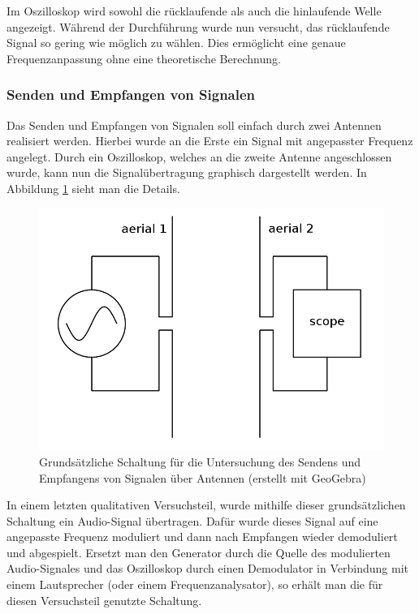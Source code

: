 		Im Oszilloskop wird sowohl die rücklaufende als auch die hinlaufende Welle angezeigt.
		Während der Durchführung wurde nun versucht, das rücklaufende Signal so gering wie möglich zu wählen.
		Dies ermöglicht eine genaue Frequenzanpassung ohne eine theoretische Berechnung.\cite{unterlagen}


	\subsubsection{Senden und Empfangen von Signalen} %
	\label{ssub:senden_und_empfangen_von_signalen}
	
		Das Senden und Empfangen von Signalen soll einfach durch zwei Antennen realisiert werden.
		Hierbei wurde an die Erste ein Signal mit angepasster Frequenz angelegt.
		Durch ein Oszilloskop, welches an die zweite Antenne angeschlossen wurde, kann nun die Signalübertragung graphisch dargestellt werden.
		In Abbildung \ref{schaltung_antennen_1} sieht man die Details.

		\begin{figure}[H]
		 	\center
		 	\includegraphics[scale = 0.4]{schaltung-antennen-01.png}
		 	\caption{\centering Grundsätzliche Schaltung für die Untersuchung des Sendens und Empfangens von Signalen über Antennen (erstellt mit GeoGebra)}
		 	\label{schaltung_antennen_1}
		\end{figure}

		In einem letzten qualitativen Versuchsteil, wurde mithilfe dieser grundsätzlichen Schaltung ein Audio-Signal übertragen.
		Dafür wurde dieses Signal auf eine angepasste Frequenz moduliert und dann nach Empfangen wieder demoduliert und abgespielt.
		Ersetzt man den Generator durch die Quelle des modulierten Audio-Signales und das Oszilloskop durch einen Demodulator in Verbindung mit einem Lautsprecher (oder einem Frequenzanalysator), so erhält man die für diesen Versuchsteil genutzte Schaltung.

		\cite{unterlagen}


